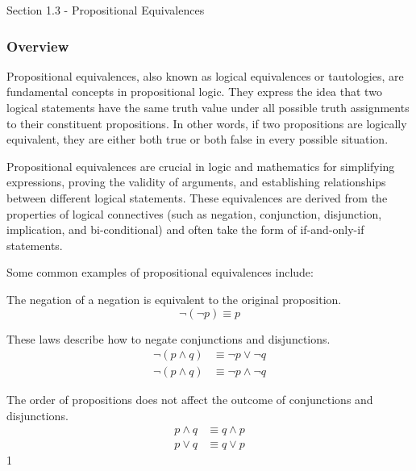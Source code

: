 \begin{notes}{Section 1.3 - Propositional Equivalences}
    \subsubsection*{Overview}

    Propositional equivalences, also known as logical equivalences or tautologies, are fundamental concepts in propositional logic. They express the idea that two logical statements have the same truth 
    value under all possible truth assignments to their constituent propositions. In other words, if two propositions are logically equivalent, they are either both true or both false in every possible 
    situation.

    Propositional equivalences are crucial in logic and mathematics for simplifying expressions, proving the validity of arguments, and establishing relationships between different logical statements. 
    These equivalences are derived from the properties of logical connectives (such as negation, conjunction, disjunction, implication, and bi-conditional) and often take the form of if-and-only-if statements.

    Some common examples of propositional equivalences include:

    \begin{Highlight}
        The negation of a negation is equivalent to the original proposition.
        \begin{equation*}
            \neg(\neg p) \equiv p
        \end{equation*}
    \end{Highlight}

    \begin{Highlight}
        These laws describe how to negate conjunctions and disjunctions.
        \begin{align*}
            \neg (p \wedge q) & \equiv \neg p \vee \neg q \\
            \neg (p \wedge q) & \equiv \neg p \wedge \neg q
        \end{align*}
    \end{Highlight}

    \begin{Highlight}
        The order of propositions does not affect the outcome of conjunctions and disjunctions.
        \begin{align*}
            p \wedge q & \equiv q \wedge p \\
            p \vee q & \equiv q \vee p
        \end{align*}1
    \end{Highlight}


\end{notes}
